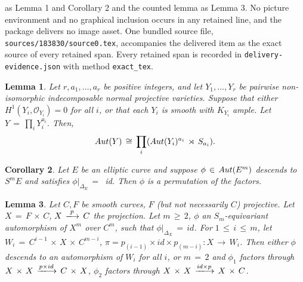 \documentclass[10pt,a4paper]{amsart}
\theoremstyle{plain}
\newtheorem{lemma}{Lemma}
\newtheorem{corollary}[lemma]{Corollary}
\theoremstyle{definition}
\theoremstyle{remark}
\begin{document}
as Lemma 1 and Corollary 2 and the counted lemma as Lemma 3. No picture environment and no graphical inclusion occurs in any retained line, and the package delivers no image asset. One bundled source file, \texttt{sources/183830/source0.tex}, accompanies the delivered item as the exact source of every retained span. Every retained span is recorded in \texttt{delivery-evidence.json} with method \texttt{exact\_tex}.
\begin{lemma}\label{autoproduct}
Let $r, a_{1},\ldots, a_{r}$ be positive integers, and let $Y_{1},\ldots, Y_{r}$ be pairwise non-isomorphic indecomposable normal projective varieties. Suppose that either $H^{1}(Y_{i}, \mathcal{O}_{Y_{i}}) = 0$ for all $i$, or that each $Y_i$ is smooth with $K_{Y_i}$ ample. Let $Y\, =\, \prod _{i} Y_{i}^{a_{i}}$. Then, 
$$\textnormal{Aut}(Y)\, \cong \,\prod_{i}(\textnormal{Aut}(Y_{i})^{a_{i}}\,\rtimes\, S_{a_{i}}).$$
\end{lemma}

\begin{corollary}\label{nounit}
Let $E$ be an elliptic curve and suppose $\phi\,\in\, \emph{Aut}(E^m)$ descends to $S^m E$ and satisfies $\phi|_{\Delta_E}\,=\,$ id. Then $\phi$ is a permutation of the factors.
\end{corollary}

\begin{lemma}\label{open}
Let $C, F$ be smooth curves, $F$ (but not necessarily $C$) projective. Let $X\,=\, F\,\times\, C$, $X\,\xlongrightarrow{p}\,C$ the projection. Let $m\,\geq\, 2$, $\phi$ an $S_m$-equivariant automorphism of $X^{m}$ over $C^{m}$, such that $\phi{|_{\Delta_{X}}}\,=\, id$. For $1\,\leq\,i\,\leq\, m$, let $W_{i}\,=\, C^{i-1}\,\times\, X\,\times\, C^{m-i}$, $\pi=p_{(i-1)}\times id \times p_{(m-i)}: X\,\to \, W_{i}$. Then either $\phi$ descends to an automorphism of $W_{i}$ for all $i$, or $m\,=\,2$ and $\phi_{1}$ factors through $X\,\times\, X\,\xlongrightarrow{p\times id}\, C\,\times\,X$, $\phi_{2}$ factors through $X\,\times\, X\,\xlongrightarrow{id\times p}\, X\,\times\, C$.
\end{lemma}
\end{document}
